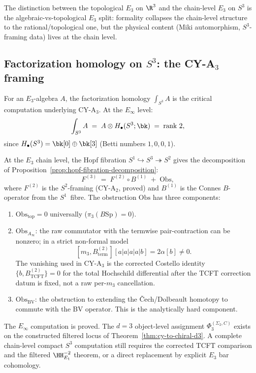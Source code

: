 \noindent The distinction between the topological $E_3$ on $\R^3$ and the chain-level $E_3$ on $S^3$ is the algebraic-vs-topological $E_3$ split: formality collapses the chain-level structure to the rational/topological one, but the physical content (Miki automorphism, $S^3$-framing data) lives at the chain level.

\subsection{Factorization homology on \texorpdfstring{$S^3$}{S-3}: the CY-A\texorpdfstring{$_3$}{-3} framing}
\label{subsec:fh-s3-framing}
\label{subsec:s3-framing-programme}

For an $E_3$-algebra $A$, the factorization homology $\int_{S^3} A$ is the critical computation underlying CY-A$_3$. At the $E_\infty$ level:
\[
 \int_{S^3} A \;=\; A \otimes H_\bullet(S^3; \bk) \;=\; \text{rank } 2,
\]
since $H_\bullet(S^3) = \bk[0] \oplus \bk[3]$ (Betti numbers $1, 0, 0, 1$).

At the $E_3$ chain level, the Hopf fibration $S^1 \hookrightarrow S^3 \twoheadrightarrow S^2$ gives the decomposition of Proposition~\ref{prop:hopf-fibration-decomposition}:
\[
 F^{(3)} \;=\; F^{(2)} \circ B^{(1)} \;+\; \mathrm{Obs},
\]
where $F^{(2)}$ is the $S^2$-framing (CY-A$_2$, proved) and $B^{(1)}$ is the Connes $B$-operator from the $S^1$~fibre. The obstruction $\mathrm{Obs}$ has three components:
\begin{enumerate}[label=\textup{(\alph*)}]
 \item $\mathrm{Obs}_{\mathrm{top}} = 0$ universally ($\pi_3(B\mathrm{Sp}) = 0$).
 \item $\mathrm{Obs}_{A_\infty}$: the raw commutator with the termwise pair-contraction can be nonzero; in a strict non-formal model
 \[
  [m_3,B^{(2)}_{\mathrm{term}}][a|a|a|a|b]=2\alpha[b]\neq0 .
 \]
 The vanishing used in CY-A$_3$ is the corrected Costello identity
 \(\{b,B^{(2)}_{\mathrm{TCFT}}\}=0\) for the total Hochschild differential after the TCFT correction datum is fixed, not a raw per-\(m_3\) cancellation.
 \item $\mathrm{Obs}_{\mathrm{BV}}$: the obstruction to extending the \v{C}ech/Dolbeault homotopy to commute with the BV operator. This is the analytically hard component.
\end{enumerate}

\noindent The $E_\infty$ computation is proved. The $d=3$ object-level assignment $\Phi_3^{(\Sigma_2,C)}$ exists on the constructed filtered locus of Theorem~\ref{thm:cy-to-chiral-d3}. A complete chain-level compact $S^3$ computation still requires the corrected TCFT comparison and the filtered \(\HH^{-2}_{E_1}\) theorem, or a direct replacement by explicit $E_3$ bar cohomology.


